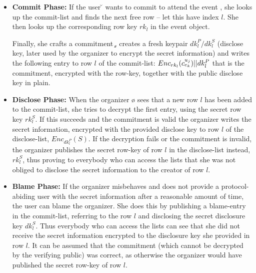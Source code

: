 \begin{itemize}
	\item \textbf{Commit Phase:}
		If the user \u{} wants to commit to attend the event \e{}, she
		looks up the commit-list and finds the next free row --
		let this have index $l$. She then looks up the corresponding row
		key $rk_l$ in the event object.
		
		Finally, she crafts a commitment \c{}, creates a fresh keypair
		$dk_l^P/dk_l^S$ (disclose key, later used by the organizer to
		encrypt the secret information) and writes the following entry
		to row $l$ of the commit-list: $Enc_{rk_l}(\c{}) || dk_l^P$
		that is the commitment, encrypted with the row-key, together
		with the public disclose key in plain.
		\\
	\item \textbf{Disclose Phase:}
		When the organizer \o{} sees that a new row $l$ has been added to the
		commit-list, she tries to decrypt the first entry, using the secret row
		key $rk_l^S$. If this succeeds and the commitment is valid %
		the organizer writes the secret information, encrypted with the provided 
		disclose key to row $l$ of the disclose-list, \ie $Enc_{dk_l^P}(S)$.
		If the decryption fails or the commitment is invalid, the
		organizer publishes the secret row-key of row $l$ in the
		disclose-list instead, \ie $rk_l^S$, 
		thus proving to everybody who can access the lists that she was not
		obliged to disclose the secret information to the creator of row $l$. %
		\\
	\item \textbf{Blame Phase:}
		If the organizer misbehaves and does not provide a
		protocol-abiding user with the secret information after a
		reasonable amount of time, %
		the user can blame the organizer. She does this by publishing a
		blame-entry in the commit-list, referring to the row $l$ and
		disclosing the secret disclosure key $dk_l^S$. Thus everybody 
		who can access the lists can see that she did not receive the
		secret information encrypted to the disclosure key she provided
		in row $l$. It can be assumed that the commitment (which cannot be
		decrypted by the verifying public) was correct, as otherwise the
		organizer would have published the secret row-key of row $l$.
\end{itemize}

